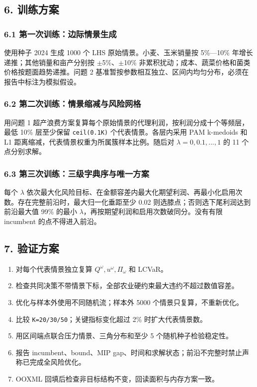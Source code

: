 \documentclass[UTF8,11pt,a4paper]{ctexart}
\begin{document}
\subsection{6. 训练方案}

\subsubsection{6.1 第一次训练：边际情景生成}

使用种子 2024 生成 1000 个 LHS 原始情景。小麦、玉米销量按 5\%—10\% 年增长递推；其他销量和亩产分别按 \ensuremath{\pm{}}5\%、\ensuremath{\pm{}}10\% 非累积扰动；成本、蔬菜价格和菌类价格按题面趋势递推。问题 2 基准暂按参数相互独立、区间内均匀分布，必须在报告中标注为模拟假设。

\subsubsection{6.2 第二次训练：情景缩减与风险网格}

用问题 1 超产浪费方案复算每个原始情景的代理利润，按利润分成十个等频层，最低 10\% 层至少保留 \texttt{ceil(0.1K)} 个代表情景。各层内采用 PAM k-medoids 和 L1 距离缩减，代表情景权重为所属簇样本比例。随后对 \(\lambda{}=0,0.1,...,1\) 的 11 个点分别求解。

\subsubsection{6.3 第三次训练：三级字典序与唯一方案}

每个 \(\lambda{}\) 依次最大化风险目标、在金额容差内最大化期望利润、再最小化启用次数。存在完整前沿时，最大归一化垂距至少 0.02 则选膝点；否则选下尾利润达到前沿最大值 99\% 的最小 \(\lambda{}\)，再按期望利润和启用次数破同分。没有有限 incumbent 的点不得进入前沿。

\subsection{7. 验证方案}

\begin{enumerate}
\item 对每个代表情景独立复算 \(Q^\omega{},u^\omega{},\Pi{}_\omega{}\) 和 LCVaR。
\item 检查共同决策不带情景下标，全部农业硬约束最大违约不超过数值容差。
\item 优化与样本外使用不同随机流；样本外 5000 个情景只复算，不重新优化。
\item 比较 \texttt{K=20/30/50}；关键指标变化超过 2\% 时扩大代表情景数。
\item 用区间端点联合压力情景、三角分布和至少 5 个随机种子检验稳定性。
\item 报告 incumbent、bound、MIP gap、时间和求解状态；前沿不完整时禁止声称已完成全风险优化。
\item OOXML 回填后检查非目标结构不变，回读面积与内存方案一致。
\end{enumerate}
\end{document}
